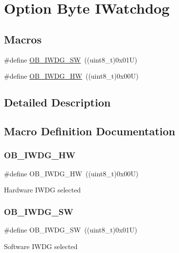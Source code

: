 \hypertarget{group___f_l_a_s_h_ex___o_b___i_watchdog}{}\section{Option Byte I\+Watchdog}
\label{group___f_l_a_s_h_ex___o_b___i_watchdog}
\subsection*{Macros}
\begin{DoxyCompactItemize}
\item 
\#define \hyperlink{group___f_l_a_s_h_ex___o_b___i_watchdog_ga5a357e232c955444c3f2ccb9a937ffce}{O\+B\+\_\+\+I\+W\+D\+G\+\_\+\+SW}~((uint8\+\_\+t)0x01\+U)
\item 
\#define \hyperlink{group___f_l_a_s_h_ex___o_b___i_watchdog_gadfcbfa963d79c339ec8e2d5a7734e47a}{O\+B\+\_\+\+I\+W\+D\+G\+\_\+\+HW}~((uint8\+\_\+t)0x00\+U)
\end{DoxyCompactItemize}


\subsection{Detailed Description}


\subsection{Macro Definition Documentation}
\mbox{\label{group___f_l_a_s_h_ex___o_b___i_watchdog_gadfcbfa963d79c339ec8e2d5a7734e47a}} 
\subsubsection{\texorpdfstring{O\+B\+\_\+\+I\+W\+D\+G\+\_\+\+HW}{OB\_IWDG\_HW}}
{\footnotesize\ttfamily \#define O\+B\+\_\+\+I\+W\+D\+G\+\_\+\+HW~((uint8\+\_\+t)0x00\+U)}

Hardware I\+W\+DG selected \mbox{\label{group___f_l_a_s_h_ex___o_b___i_watchdog_ga5a357e232c955444c3f2ccb9a937ffce}} 
\subsubsection{\texorpdfstring{O\+B\+\_\+\+I\+W\+D\+G\+\_\+\+SW}{OB\_IWDG\_SW}}
{\footnotesize\ttfamily \#define O\+B\+\_\+\+I\+W\+D\+G\+\_\+\+SW~((uint8\+\_\+t)0x01\+U)}

Software I\+W\+DG selected 